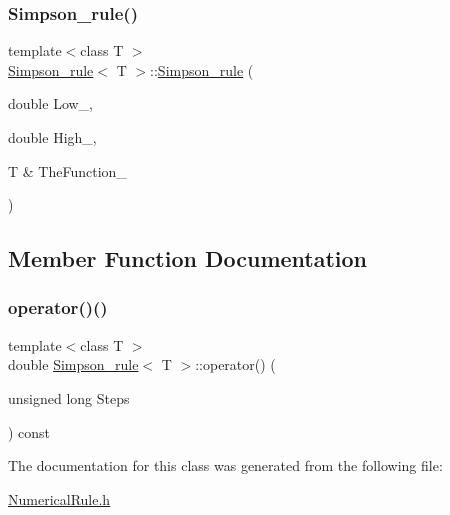 \subsubsection{\texorpdfstring{Simpson\+\_\+rule()}{Simpson\_rule()}}
{\footnotesize\ttfamily template$<$class T $>$ \\
\hyperlink{classSimpson__rule}{Simpson\+\_\+rule}$<$ T $>$\+::\hyperlink{classSimpson__rule}{Simpson\+\_\+rule} (\begin{DoxyParamCaption}\item[{double}]{Low\+\_\+,  }\item[{double}]{High\+\_\+,  }\item[{T \&}]{The\+Function\+\_\+ }\end{DoxyParamCaption})\hspace{0.3cm}{\ttfamily [inline]}}



\subsection{Member Function Documentation}
\hypertarget{classSimpson__rule_a2b8f2e5cdac22f5b5c4bc924eab46db6}{}\label{classSimpson__rule_a2b8f2e5cdac22f5b5c4bc924eab46db6} 
\subsubsection{\texorpdfstring{operator()()}{operator()()}}
{\footnotesize\ttfamily template$<$class T $>$ \\
double \hyperlink{classSimpson__rule}{Simpson\+\_\+rule}$<$ T $>$\+::operator() (\begin{DoxyParamCaption}\item[{unsigned long}]{Steps }\end{DoxyParamCaption}) const\hspace{0.3cm}{\ttfamily [inline]}}



The documentation for this class was generated from the following file\+:\begin{DoxyCompactItemize}
\item 
\hyperlink{NumericalRule_8h}{Numerical\+Rule.\+h}\end{DoxyCompactItemize}
